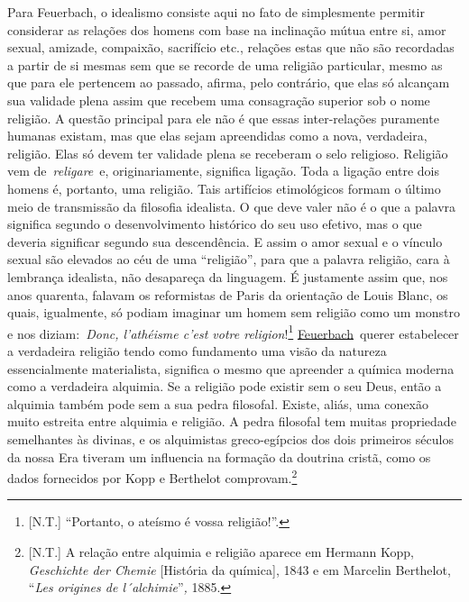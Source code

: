 Para Feuerbach, o idealismo consiste aqui no fato de simplesmente
permitir considerar as relações dos homens com base na inclinação mútua
entre si, amor sexual, amizade, compaixão, sacrifício etc., relações
estas que não são recordadas a partir de si mesmas sem que se recorde de
uma religião particular, mesmo as que para ele pertencem ao passado,
afirma, pelo contrário, que elas só alcançam sua validade plena assim
que recebem uma consagração superior sob o nome religião. A questão
principal para ele não é que essas inter-relações puramente humanas
existam, mas que elas sejam apreendidas como a nova, verdadeira,
religião. Elas só devem ter validade plena se receberam o selo
religioso. Religião vem
de~\emph{religare}\protect\hypertarget{r17}{}{}~e, originariamente,
significa ligação. Toda a ligação entre dois homens é, portanto, uma
religião. Tais artifícios etimológicos formam o último meio de
transmissão da filosofia idealista. O que deve valer não é o que a
palavra significa segundo o desenvolvimento histórico do seu uso
efetivo, mas o que deveria significar segundo sua descendência. E assim
o amor sexual e o vínculo sexual são elevados ao céu de uma
``religião'', para que a palavra religião, cara à lembrança idealista,
não desapareça da linguagem. É justamente assim que, nos anos quarenta,
falavam os reformistas de Paris da orientação de Louis Blanc, os quais,
igualmente, só podiam imaginar um homem sem religião como um monstro e
nos diziam:~\emph{Donc, l'athéisme c'est votre
religion}!\protect\hypertarget{r18}{}{}\footnote{{[}N.T.{]} ``Portanto,
  o ateísmo é vossa religião!''.}
\href{https://www.marxists.org/portugues/dicionario/verbetes/f/feuerbach.htm}{Feuerbach}~querer
estabelecer a verdadeira religião tendo como fundamento uma visão da
natureza essencialmente materialista, significa o mesmo que apreender a
química moderna como a verdadeira alquimia. Se a religião pode existir
sem o seu Deus, então a alquimia também pode sem a sua pedra filosofal.
Existe, aliás, uma conexão muito estreita entre alquimia e religião. A
pedra filosofal tem muitas propriedade semelhantes às divinas, e os
alquimistas greco-egípcios dos dois primeiros séculos da nossa Era
tiveram um influencia na formação da doutrina cristã, como os dados
fornecidos por Kopp e Berthelot comprovam.\footnote{{[}N.T.{]} A relação
  entre alquimia e religião aparece em Hermann Kopp, \emph{Geschichte
  der Chemie} {[}História da química{]}, 1843 e em Marcelin Berthelot,
  ``\emph{Les origines de l´alchimie}''\emph{,} 1885.}

